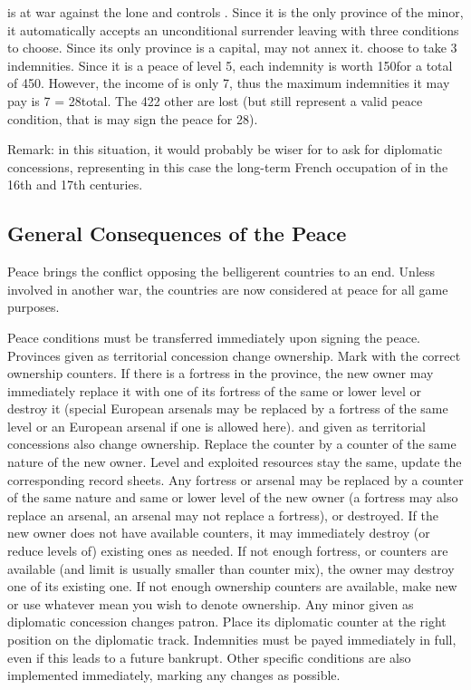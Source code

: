 \begin{exemple}
  \FRA is at war against the lone \paysLorraine and controls
  \provinceLorraine. Since it is the only province of the minor, it
  automatically accepts an unconditional surrender leaving \FRA with three
  conditions to choose. Since its only province is a capital, \FRA may not
  annex it. \FRA choose to take 3 indemnities. Since it is a peace of level 5,
  each indemnity is worth 150\ducats for a total of 450\ducats. However, the
  income of \paysLorraine is only 7\ducats, thus the maximum indemnities it
  may pay is 7  = 28\ducats total. The 422 other \ducats are
  lost (but still represent a valid peace condition, that is \FRA may sign the
  peace for 28\ducats).

  Remark: in this situation, it would probably be wiser for \FRA to ask for
  diplomatic concessions, representing in this case the long-term French
  occupation of \paysLorraine in the 16th and 17th centuries.
\end{exemple}

\subsection{General Consequences of the Peace}
\aparag Peace brings the conflict opposing the belligerent countries to an
end.
\bparag Unless involved in another war, the countries are now considered at
peace for all game purposes.

 Peace conditions must be transferred immediately
upon signing the peace.
\bparag Provinces given as territorial concession change ownership. Mark with
the correct ownership counters. If there is a fortress in the province, the
new owner may immediately replace it with one of its fortress of the same or
lower level or destroy it (special European arsenals may be replaced by a
fortress of the same level or an European arsenal if one is allowed here).
\bparag \COL and \TP given as territorial concessions also change
ownership. Replace the counter by a counter of the same nature of the new
owner. Level and exploited resources stay the same, update the corresponding
record sheets. Any fortress or arsenal may be replaced by a counter of the
same nature and same or lower level of the new owner (a fortress may also
replace an arsenal, an arsenal may not replace a fortress), or destroyed.
\bparag If the new owner does not have available counters, it may immediately
destroy (or reduce levels of) existing ones as needed.
\bparag If not enough fortress, \COL or \TP counters are available (\COL and
\TP limit is usually smaller than counter mix), the owner may destroy one of
its existing one. If not enough ownership counters are available, make new or
use whatever mean you wish to denote ownership.
\bparag Any minor given as diplomatic concession changes patron. Place its
diplomatic counter at the right position on the diplomatic track.
\bparag Indemnities must be payed immediately in full, even if this leads to a
future bankrupt.
\bparag Other specific conditions are also implemented immediately, marking
any changes as possible.

